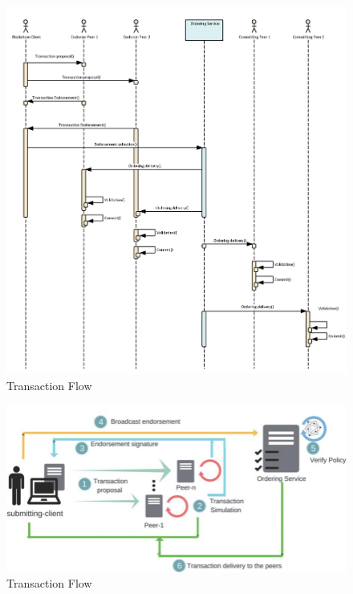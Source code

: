 \documentclass[12pt,a4paper]{article}
\theoremstyle{definition}
\begin{document}
\begin{figure}[]
    \includegraphics[scale=0.85]{figures/back_hf_transaction_flow.png}
    \centering
\caption{Transaction Flow \cite{fabric}}
    \label{fig: Fabric's Transaction Flow}
\end{figure}

\begin{figure}[h]

    \includegraphics[scale=0.5]{figures/transaction_flow.png}
    \centering
 \caption{Transaction Flow \cite{transaction_flow}}
    \label{fig: Fabric's Transaction Flow}
\end{figure}
\end{document}
